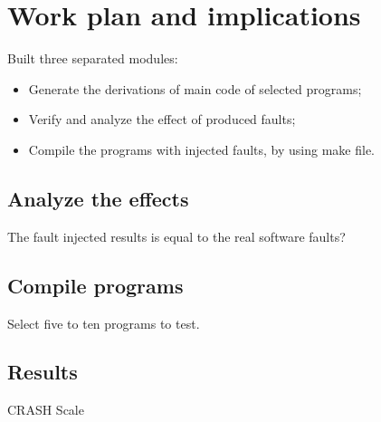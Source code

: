 \newpage
\section{Work plan and implications}

Built three separated modules:

\begin{itemize}
	\item Generate the derivations of main code of selected programs;
	\item Verify and analyze the effect of produced faults;
	\item Compile the programs with injected faults, by using make file.
\end{itemize}

\subsection{Analyze the effects}

The fault injected results is equal to the real software faults?

\subsection{Compile programs}

Select five to ten programs to test.

\subsection{Results}

CRASH Scale
